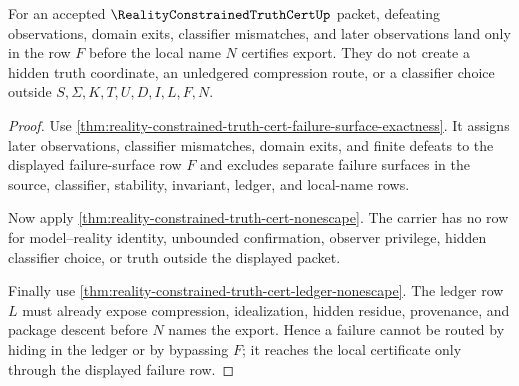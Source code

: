 \begin{theorem}
\label{thm:reality-constrained-truth-cert-failure-routing}
For an accepted $\RealityConstrainedTruthCertUp$ packet, defeating observations,
domain exits, classifier mismatches, and later observations land only in the row
$F$ before the local name $N$ certifies export. They do not create a hidden truth
coordinate, an unledgered compression route, or a classifier choice outside
$S,\Sigma,K,T,U,D,I,L,F,N$.
\end{theorem}
\begin{proof}
Use \autoref{thm:reality-constrained-truth-cert-failure-surface-exactness}. It
assigns later observations, classifier mismatches, domain exits, and finite
defeats to the displayed failure-surface row $F$ and excludes separate failure
surfaces in the source, classifier, stability, invariant, ledger, and local-name
rows.

Now apply \autoref{thm:reality-constrained-truth-cert-nonescape}. The carrier has
no row for model--reality identity, unbounded confirmation, observer privilege,
hidden classifier choice, or truth outside the displayed packet.

Finally use \autoref{thm:reality-constrained-truth-cert-ledger-nonescape}. The
ledger row $L$ must already expose compression, idealization, hidden residue,
provenance, and package descent before $N$ names the export. Hence a failure
cannot be routed by hiding in the ledger or by bypassing $F$; it reaches the
local certificate only through the displayed failure row.
\end{proof}

